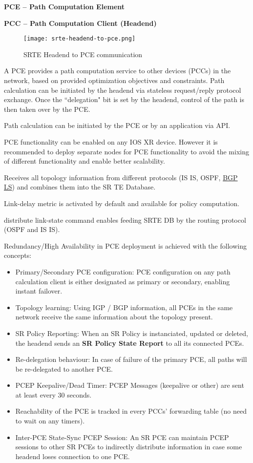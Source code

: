 \textbf{PCE -- Path Computation Element}

\textbf{PCC -- Path Computation Client (Headend)}

\begin{figure}
    \centering
    \texttt{[image: srte-headend-to-pce.png]}
    \caption{SRTE Headend to PCE communication}
\end{figure}

\vspace{5mm}
\noindent
A PCE provides a path computation service to other devices (PCCs) in the network, based on provided optimization objectives and constraints.
Path calculation can be initiated by the headend via stateless request/reply protocol exchange.
Once the ``delegation" bit is set by the headend, control of the path is then taken over by the PCE.

Path calculation can be initiated by the PCE or by an application via API.

PCE functionality can be enabled on any IOS XR device. However it is recommended to deploy separate nodes for PCE 
functionality to avoid the mixing of different functionality and enable better scalability.

Receives all topology information from different protocols 
(IS IS, OSPF, \href{https://www.noction.com/blog/bgp-ls-link-state}{BGP LS}) and combines them into the SR TE Database.

Link-delay metric is activated by default and available for policy computation.

\ttfamily distribute link-state \rmfamily command enables feeding SRTE DB by the routing protocol (OSPF and IS IS).

Redundancy/High Availability in PCE deployment is achieved with the following concepts:
\begin{itemize}
    \item Primary/Secondary PCE configuration: PCE configuration on any path calculation client is either designated as primary or secondary, enabling instant failover. 
    \item Topology learning: Using IGP / BGP information, all PCEs in the same network receive the same information about the topology present.
    \item SR Policy Reporting: When an SR Policy is instanciated, updated or deleted, the headend sends an \textbf{SR Policy State Report }to all its connected PCEs.
    \item Re-delegation behaviour: In case of failure of the primary PCE, all paths will be re-delegated to another PCE.   
    \item PCEP Keepalive/Dead Timer: PCEP Messages (keepalive or other) are sent at least every 30 seconds.
    \item Reachability of the PCE is tracked in every PCCs' forwarding table (no need to wait on any timers). 
    \item Inter-PCE State-Sync PCEP Session: An SR PCE can maintain PCEP sessions to other SR PCEs to indirectly distribute information in case some headend loses connection to one PCE. 
\end{itemize}

